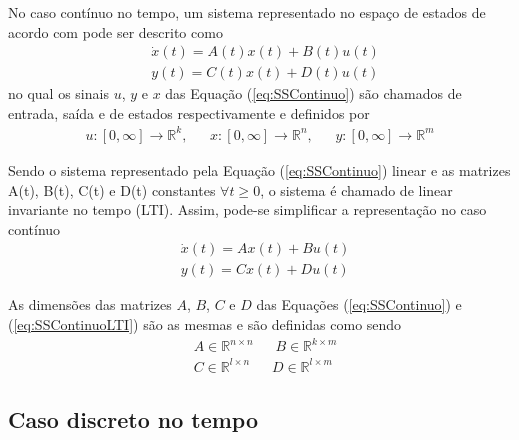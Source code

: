 No caso contínuo no tempo, um sistema representado no espaço de estados de acordo com \cite{Hespanha} pode ser descrito como
\begin{equation} \label{eq:SSContinuo}
    \begin{array}{cc}
         & \dot{x}(t) = A(t)x(t) + B(t)u(t) \\[6pt]
         & y(t) = C(t)x(t) + D(t)u(t)
    \end{array}{}
\end{equation}{}
no qual os sinais $u$, $y$ e $x$ das Equação (\ref{eq:SSContinuo}) são chamados de entrada, saída e de estados respectivamente e definidos por
\begin{equation*}
    \begin{array}{c}
        u:[0,\infty] \rightarrow \mathbb{R}^k, ~~~~~~~
        x:[0,\infty] \rightarrow \mathbb{R}^n, ~~~~~~~
        y:[0,\infty] \rightarrow \mathbb{R}^m
    \end{array}{}
\end{equation*}{}

Sendo o sistema representado pela Equação (\ref{eq:SSContinuo}) linear e as matrizes A(t), B(t), C(t) e D(t) constantes $\forall t \ge 0$, o sistema  é chamado de linear invariante no tempo (LTI). Assim, pode-se simplificar a representação no caso contínuo
\begin{equation}\label{eq:SSContinuoLTI}
    \begin{array}{cc}
         & \dot{x}(t) = Ax(t) + Bu(t) \\[6pt]
         & y(t) = Cx(t) + Du(t)
    \end{array}{}
\end{equation}{}

As dimensões das matrizes $A$, $B$, $C$ e $D$ das Equações (\ref{eq:SSContinuo}) e (\ref{eq:SSContinuoLTI}) são as mesmas e são definidas como sendo
\begin{equation*}
    \begin{array}{cc}
    &    A \in \mathbb{R}^{n \times n} ~~~~~~~
         B \in \mathbb{R}^{k \times m}  \\[6pt]
    &    C \in \mathbb{R}^{l \times n} ~~~~~~~
         D \in \mathbb{R}^{l \times m}
    \end{array}{}
\end{equation*}{}


\subsection{Caso discreto no tempo}

